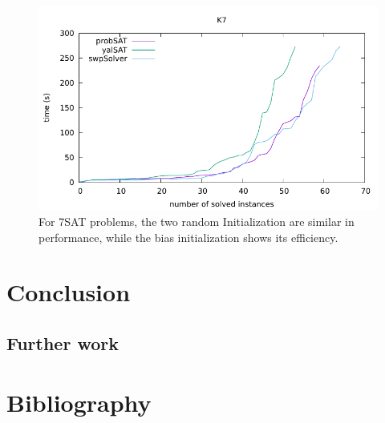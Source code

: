 \documentclass[12pt,a4paper,twoside]{scrartcl}
\numberwithin{equation}{section}
\begin{document}
  \begin{figure}[H]
\begin{center}
  \includegraphics[scale = 1]{DATA/K7/e5.pdf}
  \end{center}
  \caption{For 7SAT problems, the two random Initialization are similar in performance, while the bias initialization shows its efficiency.}
  \label{Experiment 7 k7-w cactus plot}
  \end{figure} 


  
\section{Conclusion}
\label{sec:conc}
\subsection{Further work}
\section{Bibliography}


\end{document}
